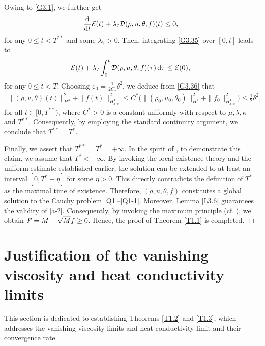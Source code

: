 \documentclass[reqno,11pt]{amsart}
\theoremstyle{plain}
\numberwithin{equation}{section}
\newcommand{\eps}{{\varepsilon}}
\begin{document}
Owing to \eqref{G3.1}, we further get
\begin{align}\label{G3.35}
 \frac{{\rm d}}{{\rm d}t} \mathcal{E}(t) + \lambda_7\mathcal{D}(\rho,u,\theta,f)(t) \leq 0, 
\end{align}
for any $0 \leq t < T^{**}$ and   some $\lambda_7>0$.
Then, integrating \eqref{G3.35} over   $[0,t]$ leads to  
\begin{align}  \label{G3.36}
\mathcal{E}(t) + \lambda_7 \int_0^t \mathcal{D}(\rho, u, \theta, f)(\tau) \, {\rm d}\tau \leq \mathcal{E}(0),  
\end{align}  
for any $0 \leq t < T$.
Choosing $\eps_0 = \frac{1}{2C_*}\delta ^2$, we deduce from \eqref{G3.36} that  
\begin{align*}  
\|(\rho, u, \theta)(t)\|_{H^4}^2 + \|f(t)\|_{H_{x,v}^4}^2 \leq C^*\big(\|(\rho_0, u_0, \theta_0)\|_{H^4}^2 + \|f_0\|_{H_{x,v}^4}^2\big) \leq \frac{1}{2}\delta^2,  
\end{align*}  
for all $t \in [0, T^{**})$, where $C^*>0$ is a constant uniformly with respect to $\mu, \lambda, \kappa$ and $T^{**}$. Consequently, by employing the standard continuity argument, we conclude that $T^{**} = T^*$.
    
Finally, we assert that $T^{**} = T^{*} = +\infty$. In the spirit of \cite{CDM-krm-2011}, to demonstrate this claim, we assume %
that $T^{*} < +\infty$. By invoking the local existence theory and the uniform estimate 
established earlier, the solution can be extended to at least an interval
 $[0, T^{*} + \eta]$ for some $\eta > 0$. This directly contradicts
  the definition of $T^{*}$ as the maximal time of existence. 
  Therefore, $(\rho, u, \theta, f)$ constitutes a global 
  solution to the Cauchy problem \eqref{Q1}--\eqref{Q1-1}. 
  Moreover, Lemma \ref{L3.6} guarantees the validity of 
  \eqref{a-2}. Consequently, by invoking the maximum principle (cf. \cite{GY-iumj-2004}), we obtain
 $F = M + \sqrt{M}f \linebreak \geq 0$. Hence, the proof of Theorem \ref{T1.1} is completed.
 \hfill $\Box$


 
\section{{Justification of the vanishing viscosity  and    heat conductivity limits }} 

This section is dedicated to establishing Theorems \ref{T1.2} 
and \ref{T1.3}, which addresses the vanishing viscosity limits and 
 heat conductivity limit and their convergence rate.
\end{document}
